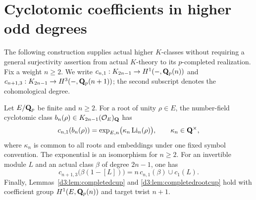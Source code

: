 \section{Cyclotomic coefficients in higher odd degrees}
\label{d3:sec:completedhigherodd}

The following construction supplies actual higher $K$-classes without
requiring a general surjectivity assertion from actual $K$-theory to
its $p$-completed realization. Fix a weight $n\geq2$. We write
$c_{n,1}:K_{2n-1}\to H^1(-,\mathbf Q_p(n))$ and
$c_{n+1,3}:K_{2n-1}\to H^3(-,\mathbf Q_p(n+1))$; the second subscript
denotes the cohomological degree.

\begin{lemma}
\label{d3:lem:highercoefficients}
Let $E/\mathbf Q_p$ be finite and $n\geq2$.
For a root of unity $\rho\in E$, the number-field cyclotomic class
$b_n(\rho)\in K_{2n-1}(\mathcal O_E)_{\mathbf Q}$ has
\begin{equation}\label{d3:eq:highercyclotomicregulator}
 c_{n,1}(b_n(\rho))
 =\exp_{E,n}\bigl(\kappa_n\operatorname{Li}_n(\rho)\bigr),
 \qquad \kappa_n\in\mathbf Q^\times,
\end{equation}
where $\kappa_n$ is common to all roots and embeddings under one
fixed symbol convention. The exponential is an isomorphism for
$n\geq2$. For an invertible module $L$ and an actual class $\beta$
of degree $2n-1$, one has
\begin{equation}\label{d3:eq:higherlineproduct}
 c_{n+1,3}\bigl(\beta(1-[L])\bigr)
 =n\,c_{n,1}(\beta)\cup c_1(L).
\end{equation}
Finally, Lemmas~\ref{d3:lem:completedcup} and
\ref{d3:lem:completedrootcup} hold with coefficient group
$H^1(E,\mathbf Q_p(n))$ and target twist $n+1$.
\end{lemma}
